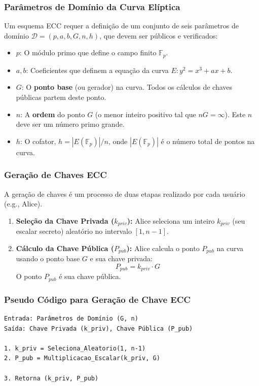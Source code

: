 \documentclass{article}
\theoremstyle{definicao_estilo}
\begin{document}
\subsubsection{Parâmetros de Domínio da Curva Elíptica}
Um esquema ECC requer a definição de um conjunto de seis parâmetros de domínio $\mathcal{D} = (p, a, b, G, n, h)$, que devem ser públicos e verificados:
\begin{itemize}
\item $p$: O módulo primo que define o campo finito $\mathbb{F}_p$.
\item $a, b$: Coeficientes que definem a equação da curva $E: y^2 = x^3 + ax + b$.
\item $G$: O \textbf{ponto base} (ou gerador) na curva. Todos os cálculos de chaves públicas partem deste ponto.
\item $n$: A \textbf{ordem} do ponto $G$ (o menor inteiro positivo tal que $nG = \infty$). Este $n$ deve ser um número primo grande.
\item $h$: O cofator, $h = |E(\mathbb{F}_p)|/n$, onde $|E(\mathbb{F}_p)|$ é o número total de pontos na curva.
\end{itemize}

\subsubsection{Geração de Chaves ECC}
A geração de chaves é um processo de duas etapas realizado por cada usuário (e.g., Alice).

\begin{enumerate}
\item \textbf{Seleção da Chave Privada ($k_{priv}$):} Alice seleciona um inteiro $k_{priv}$ (seu escalar secreto) aleatório no intervalo $[1, n-1]$.
\item \textbf{Cálculo da Chave Pública ($P_{pub}$):} Alice calcula o ponto $P_{pub}$ na curva usando o ponto base $G$ e sua chave privada:
$$ P_{pub} = k_{priv} \cdot G $$
O ponto $P_{pub}$ é sua chave pública.
\end{enumerate}

\subsubsection{Pseudo Código para Geração de Chave ECC}
\begin{verbatim}
Entrada: Parâmetros de Domínio (G, n)
Saída: Chave Privada (k_priv), Chave Pública (P_pub)

1. k_priv = Seleciona_Aleatorio(1, n-1)
2. P_pub = Multiplicacao_Escalar(k_priv, G)

3. Retorna (k_priv, P_pub)
\end{verbatim}
\end{document}
